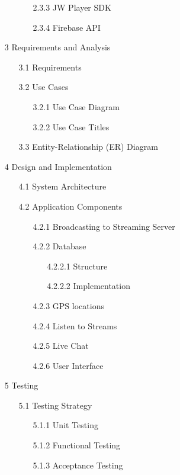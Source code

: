 \documentclass{article}
\begin{document}
\begin{itemize}
\begin{itemize}
\begin{itemize}
			\item [2.3.3] JW Player SDK
			\item [2.3.4] Firebase API
		\end{itemize}
	\end{itemize}
    	\item [3] Requirements and Analysis
	\begin{itemize}
		\item [3.1] Requirements
		\item [3.2] Use Cases
		\begin{itemize}
			\item [3.2.1] Use Case Diagram
			\item [3.2.2] Use Case Titles
		\end{itemize}
		\item [3.3] Entity-Relationship (ER) Diagram
	\end{itemize}
	\item [4] Design and Implementation
	\begin{itemize}
		\item [4.1] System Architecture
		\item [4.2] Application Components
		\begin{itemize}
			\item [4.2.1] Broadcasting to Streaming Server
			\item [4.2.2] Database
			\begin{itemize}
				\item [4.2.2.1] Structure
				\item [4.2.2.2] Implementation
			\end{itemize}
			\item [4.2.3] GPS locations
			\item [4.2.4] Listen to Streams
			\item [4.2.5] Live Chat
			\item [4.2.6] User Interface
		\end{itemize}
	\end{itemize}
	\item [5] Testing
	\begin{itemize}
		\item [5.1] Testing Strategy
		\begin{itemize}
			\item [5.1.1] Unit Testing
			\item [5.1.2] Functional Testing
			\item [5.1.3] Acceptance Testing
		\end{itemize}

\end{itemize}
\end{itemize}
\end{document}
